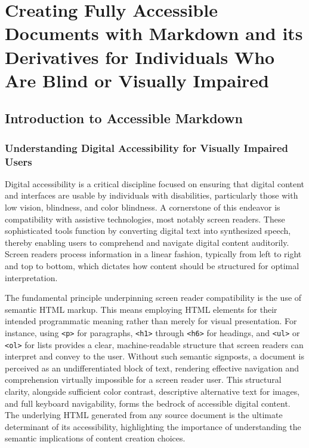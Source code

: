 \chapter{Creating Fully Accessible Documents with Markdown and its Derivatives for Individuals Who Are Blind or Visually Impaired}
\label{chap:accessible-markdown}

\section{Introduction to Accessible Markdown}
\label{sec:intro-accessible-markdown}

\subsection{Understanding Digital Accessibility for Visually Impaired Users}
Digital accessibility is a critical discipline focused on ensuring that digital content and interfaces are usable by individuals with disabilities, particularly those with low vision, blindness, and color blindness. \cite{ReciteMe,TextToBraille} A cornerstone of this endeavor is compatibility with assistive technologies, most notably screen readers. \cite{ReciteMe,TestDevLab} These sophisticated tools function by converting digital text into synthesized speech, thereby enabling users to comprehend and navigate digital content auditorily. \cite{ReciteMe,TestDevLab} Screen readers process information in a linear fashion, typically from left to right and top to bottom, which dictates how content should be structured for optimal interpretation. \cite{DSU,SmashingMagazine}

The fundamental principle underpinning screen reader compatibility is the use of semantic HTML markup. This means employing HTML elements for their intended programmatic meaning rather than merely for visual presentation. \cite{MDNHTML,UniversalDesign} For instance, using \texttt{<p>} for paragraphs, \texttt{<h1>} through \texttt{<h6>} for headings, and \texttt{<ul>} or \texttt{<ol>} for lists provides a clear, machine-readable structure that screen readers can interpret and convey to the user. Without such semantic signposts, a document is perceived as an undifferentiated block of text, rendering effective navigation and comprehension virtually impossible for a screen reader user. \cite{MDNHTML,UniversalDesign} This structural clarity, alongside sufficient color contrast, descriptive alternative text for images, and full keyboard navigability, forms the bedrock of accessible digital content. \cite{ReciteMe,TestDevLab,MDNHTML} The underlying HTML generated from any source document is the ultimate determinant of its accessibility, highlighting the importance of understanding the semantic implications of content creation choices.

